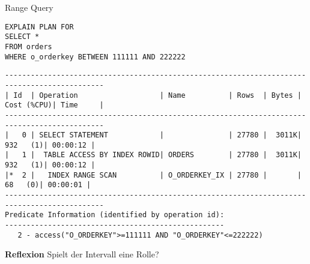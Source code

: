\documentclass[10pt]{article}
\begin{document}
Range Query
\begin{lstlisting}[style=sql]
EXPLAIN PLAN FOR
SELECT *
FROM orders
WHERE o_orderkey BETWEEN 111111 AND 222222
\end{lstlisting}
\begin{lstlisting}[style=queryexecutionplan]
---------------------------------------------------------------------------------------------
| Id  | Operation                   | Name          | Rows  | Bytes | Cost (%CPU)| Time     |
---------------------------------------------------------------------------------------------
|   0 | SELECT STATEMENT            |               | 27780 |  3011K|   932   (1)| 00:00:12 |
|   1 |  TABLE ACCESS BY INDEX ROWID| ORDERS        | 27780 |  3011K|   932   (1)| 00:00:12 |
|*  2 |   INDEX RANGE SCAN          | O_ORDERKEY_IX | 27780 |       |    68   (0)| 00:00:01 |
---------------------------------------------------------------------------------------------
Predicate Information (identified by operation id):
---------------------------------------------------
   2 - access("O_ORDERKEY">=111111 AND "O_ORDERKEY"<=222222)
\end{lstlisting}
\textbf{Reflexion} \newline
Spielt der Intervall eine Rolle?
\end{document}
